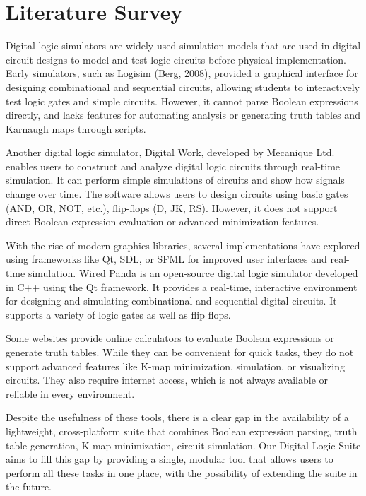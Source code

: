 \section{Literature Survey}
Digital logic simulators are widely used simulation models that are used in digital circuit designs to model and test logic circuits before physical implementation. Early simulators, such as Logisim (Berg, 2008), provided a graphical interface for designing combinational and sequential circuits, allowing students to interactively test logic gates and simple circuits. However, it cannot parse Boolean expressions directly, and lacks features for automating analysis or generating truth tables and Karnaugh maps through scripts.

\vspace{0.30cm}
Another digital logic simulator, Digital Work, developed by Mecanique Ltd. enables users to construct and analyze digital logic circuits through real-time simulation. It can perform simple simulations of circuits and show how signals change over time. The software allows users to design circuits using basic gates (AND, OR, NOT, etc.), flip-flops (D, JK, RS). However, it does not support direct Boolean expression evaluation or advanced minimization features.

\vspace{0.30cm}
With the rise of modern graphics libraries, several implementations have explored using frameworks like Qt, SDL, or SFML for improved user interfaces and real-time simulation. Wired Panda is an open-source digital logic simulator developed in C++ using the Qt framework. It provides a real-time, interactive environment for designing and simulating combinational and sequential digital circuits. It supports a variety of logic gates as well as flip flops.

\vspace{0.30cm}
Some websites provide online calculators to evaluate Boolean expressions or generate truth tables. While they can be convenient for quick tasks, they do not support advanced features like K-map minimization, simulation, or visualizing circuits. They also require internet access, which is not always available or reliable in every environment.

\vspace{0.30cm}
Despite the usefulness of these tools, there is a clear gap in the availability of a lightweight, cross-platform suite that combines Boolean expression parsing, truth table generation, K-map minimization, circuit simulation. Our Digital Logic Suite aims to fill this gap by providing a single, modular tool that allows users to perform all these tasks in one place, with the possibility of extending the suite in the future.
\clearpage